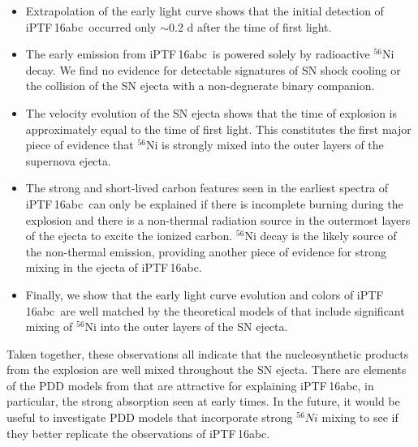 \documentclass[twocolumn]{aastex61}
\newcommand{\abc}{iPTF\,16abc}
\begin{document}
\begin{itemize}
    \item Extrapolation of the early light curve shows that the initial detection of \abc\ occurred only $\sim$0.2 d after the time of first light.

    \item The early emission from \abc\ is powered solely by radioactive $^{56}$Ni decay. We find no evidence for detectable signatures of SN shock cooling or the collision of the SN ejecta with a non-degnerate binary companion.

\item The velocity evolution of the SN ejecta shows that the time of explosion is approximately equal to the time of first light. This constitutes the first major piece of evidence that $^{56}$Ni is strongly mixed into the outer layers of the supernova ejecta.

\item The strong and short-lived carbon features seen in the 
earliest spectra of \abc\ can only be explained if there is incomplete burning during the explosion and there is a non-thermal 
radiation source in the outermost layers of the ejecta to excite the ionized carbon. $^{56}$Ni decay is the likely source of the non-thermal emission, providing another piece of evidence for strong mixing in the ejecta of \abc. 

\item Finally, we show that the early light curve evolution and colors of \abc\ are well matched by the theoretical models of \citet{2016ApJ...826...96P} that include significant mixing of $^{56}$Ni into the outer layers of the SN ejecta. 
 
\end{itemize}
%
Taken together, these observations all indicate that the nucleosynthetic products from the explosion are well mixed throughout the SN ejecta. There are elements of the PDD models from \citet{2014MNRAS.441..532D} that are attractive for explaining \abc, in particular, the strong  absorption seen at early times. In the future, it would be useful to investigate PDD models that incorporate strong $^{56}Ni$ mixing to see if they better replicate the observations of \abc.  
\end{document}

